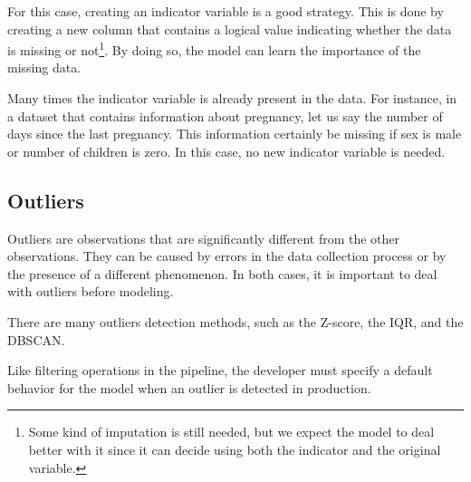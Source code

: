 For this case, creating an indicator variable is a good strategy.  This is done by creating
a new column that contains a logical value indicating whether the data is missing or
not\footnote{Some kind of imputation is still needed, but we expect the model to deal
better with it since it can decide using both the indicator and the original variable.}.
By doing so, the model can learn the importance of the missing data.


Many times the indicator variable is already present in the data.  For instance, in a
dataset that contains information about pregnancy, let us say the number of days since
the last pregnancy.  This information certainly be missing if sex is male
or number of children is zero.  In this case, no new indicator variable is needed.

\subsection{Outliers}

Outliers are observations that are significantly different from the other observations.
They can be caused by errors in the data collection process or by the presence of a
different phenomenon.  In both cases, it is important to deal with outliers before
modeling.

There are many outliers detection methods, such as the Z-score, the IQR, and the DBSCAN.

Like filtering operations in the pipeline, the developer must specify a default behavior
for the model when an outlier is detected in production.

